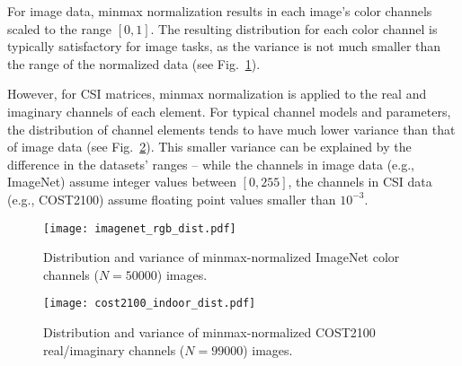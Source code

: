 For image data, minmax normalization results in each image's color channels scaled to the range $[0,1]$. The resulting distribution for each color channel is typically satisfactory for image tasks, as the variance is not much smaller than the range of the normalized data (see Fig.~\ref{fig:imagenet_dist}).

However, for CSI matrices, minmax normalization is applied to the real and imaginary channels of each element. For typical channel models and parameters, the distribution of channel elements tends to have much lower variance than that of image data (see Fig.~\ref{fig:cost_indoor_dist}). This smaller variance can be explained by the difference in the datasets' ranges -- while the channels in image data (e.g., ImageNet) assume integer values between $[0,255]$, the channels in CSI data (e.g., COST2100) assume floating point values smaller than $10^{-3}$.

\begin{figure}[htb]
	\centering
	\texttt{[image: imagenet\_rgb\_dist.pdf]}
	\medskip
	\caption{Distribution and variance of minmax-normalized ImageNet color channels ($N=50000$) images.}
	\label{fig:imagenet_dist}
\end{figure}

\begin{figure}[htb]
	\centering
	\texttt{[image: cost2100\_indoor\_dist.pdf]}
	\medskip
	\caption{Distribution and variance of minmax-normalized COST2100 real/imaginary channels ($N=99000$) images.}
	\label{fig:cost_indoor_dist}
\end{figure}




